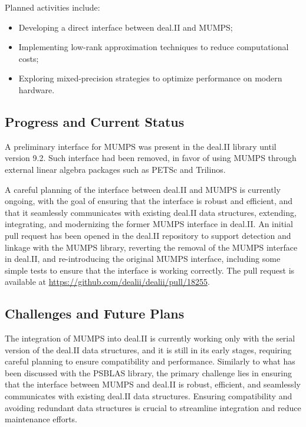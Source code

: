 \documentclass[a4paper,12pt]{article}
\begin{document}
    Planned activities include:
    \begin{itemize}
        \item Developing a direct interface between deal.II and MUMPS;
        \item Implementing low-rank approximation techniques to reduce computational costs;
        \item Exploring mixed-precision strategies to optimize performance on modern hardware.
    \end{itemize}

    \subsection{Progress and Current Status}
    A preliminary interface for MUMPS was present in the deal.II library until
    version 9.2. Such interface had been removed, in favor of using MUMPS
    through external linear algebra packages such as PETSc and Trilinos.
    
    A careful planning of the interface between deal.II and MUMPS is currently
    ongoing, with the goal of ensuring that the interface is robust and efficient,
    and that it seamlessly communicates with existing deal.II data structures, extending, integrating, and modernizing the former MUMPS interface in deal.II. An initial pull request
    has been opened in the deal.II repository to support detection and linkage
    with the MUMPS library, reverting the removal of the MUMPS interface in deal.II, and re-introducing the original MUMPS interface, including some simple tests to ensure that the interface is working correctly. The pull request is available at
    \url{https://github.com/dealii/dealii/pull/18255}.
    
    \subsection{Challenges and Future Plans}

    The integration of MUMPS into deal.II is currently working only with the
    serial version of the deal.II data structures, and it is still in its early
    stages, requiring careful planning to ensure compatibility and performance.
    Similarly to what has been discussed with the PSBLAS library, the primary
    challenge lies in ensuring that the interface between MUMPS and deal.II is
    robust, efficient, and seamlessly communicates with existing deal.II data
    structures. Ensuring compatibility and avoiding redundant data structures is
    crucial to streamline integration and reduce maintenance efforts.



    
\label{MyLastPage}
\end{document}
